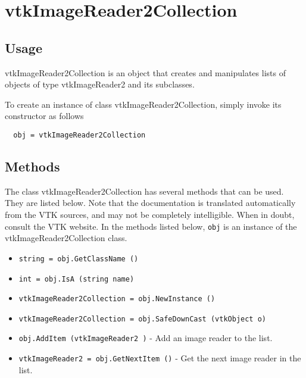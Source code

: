 \section{vtkImageReader2Collection}

\subsection{Usage}

 vtkImageReader2Collection is an object that creates and manipulates
 lists of objects of type vtkImageReader2 and its subclasses. 

To create an instance of class vtkImageReader2Collection, simply
invoke its constructor as follows
\begin{verbatim}
  obj = vtkImageReader2Collection
\end{verbatim}
\subsection{Methods}

The class vtkImageReader2Collection has several methods that can be used.
  They are listed below.
Note that the documentation is translated automatically from the VTK sources,
and may not be completely intelligible.  When in doubt, consult the VTK website.
In the methods listed below, \verb|obj| is an instance of the vtkImageReader2Collection class.
\begin{itemize}
\item  \verb|string = obj.GetClassName ()|

\item  \verb|int = obj.IsA (string name)|

\item  \verb|vtkImageReader2Collection = obj.NewInstance ()|

\item  \verb|vtkImageReader2Collection = obj.SafeDownCast (vtkObject o)|

\item  \verb|obj.AddItem (vtkImageReader2 )| -  Add an image reader to the list.

\item  \verb|vtkImageReader2 = obj.GetNextItem ()| -  Get the next image reader in the list.

\end{itemize}
